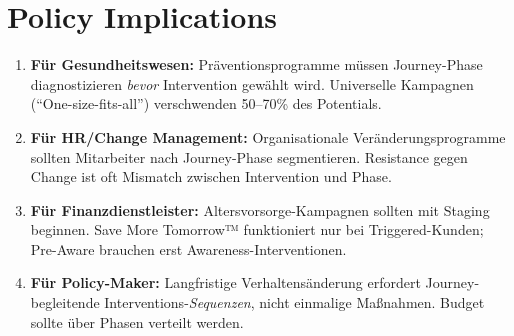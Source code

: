 
\section*{Policy Implications}

\begin{enumerate}
\item \textbf{Für Gesundheitswesen:} Präventionsprogramme müssen Journey-Phase diagnostizieren \textit{bevor} Intervention gewählt wird. Universelle Kampagnen (``One-size-fits-all'') verschwenden 50--70\% des Potentials.

\item \textbf{Für HR/Change Management:} Organisationale Veränderungsprogramme sollten Mitarbeiter nach Journey-Phase segmentieren. Resistance gegen Change ist oft Mismatch zwischen Intervention und Phase.

\item \textbf{Für Finanzdienstleister:} Altersvorsorge-Kampagnen sollten mit Staging beginnen. Save More Tomorrow™ funktioniert nur bei Triggered-Kunden; Pre-Aware brauchen erst Awareness-Interventionen.

\item \textbf{Für Policy-Maker:} Langfristige Verhaltensänderung erfordert Journey-begleitende Interventions-\textit{Sequenzen}, nicht einmalige Maßnahmen. Budget sollte über Phasen verteilt werden.
\end{enumerate}


